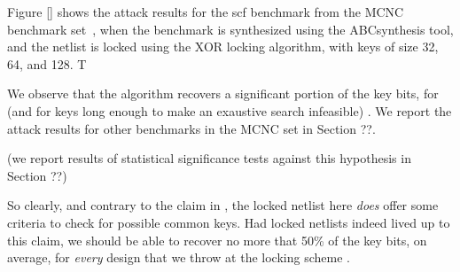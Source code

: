 Figure \ref{} shows the attack results for the scf benchmark from the MCNC benchmark set~\cite{}, when the benchmark is synthesized using the ABCsynthesis tool, and the netlist is locked using the XOR locking algorithm, with keys of size 32, 64, and 128. T


We observe that the algorithm recovers a significant portion of the key bits, for (and for keys long enough to make an exaustive search infeasible) . We report the attack results for other benchmarks in the MCNC set in Section ??.

(we report results of statistical significance tests against this hypothesis in Section ??)

So clearly, and contrary to the claim in \cite{roy2008epic}, the locked netlist here \emph{does} offer some criteria to check for possible common keys. Had locked netlists indeed lived up to this claim, we should be able to recover no more that 50\% of the key bits, on average, for \emph{every} design that we throw at the locking scheme .



